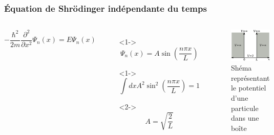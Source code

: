 \documentclass{beamer}
\begin{document}
\begin{frame}
\frametitle{Équation de Shrödinger indépendante du temps}

\begin{columns}

\begin{equation}\tag{4}
-\frac{\hbar^2}{2m}\frac{\partial^2}{\partial x^2}\Psi_n(x)=E\Psi_n(x)
\end{equation} 

\begin{itemize}
\item[]<1-> \begin{equation}\tag{5}
\Psi_n(x)=A\sin(\frac{n\pi x}{L})
\end{equation}  
\item[]<1-> \begin{equation}\tag{6}
\int dx A^2\sin^2(\frac{n\pi x}{L})=1
\end{equation}
\item[]  <2-> \begin{equation}\tag{7}
A=\sqrt{\frac{2}{L}}
\end{equation}
\end{itemize}
\begin{figure}
\includegraphics[scale=0.4]{Pot}
\caption{Shéma représentant le potentiel d'une particule dans une boîte}
\end{figure}
\end{columns}

\end{frame}
\end{document}
